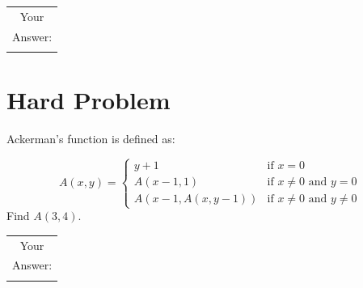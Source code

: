 \documentclass[12pt]{article}
\begin{document}
\hfill
    \begin{tabular}[b]{|c|}
        \hline
        Your\\
        Answer:\\
        \\
        \hline
    \end{tabular}
\hfill

\section{Hard Problem}
\label{prob:hard}
Ackerman's function is defined as:

\begin{equation*}
A(x, y) =
\begin{cases}
y + 1 & \text{if $x = 0$}\\
A(x - 1, 1) & \text{if $x \neq 0$ and $y = 0$}\\
A(x - 1, A(x, y - 1)) & \text{if $x \neq 0$ and $y \neq 0$}
\end{cases}
\end{equation*}
Find $A(3, 4)$.
\vspace{2cm}

\hfill
    \begin{tabular}[b]{|c|}
        \hline
        Your\\
        Answer:\\
        \\
        \hline
    \end{tabular}
\hfill
\end{document}
